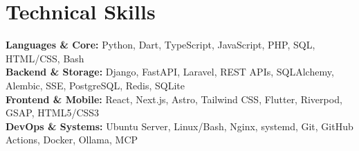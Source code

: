 \section{Technical Skills}

\noindent
\textbf{Languages \& Core:} Python, Dart, TypeScript, JavaScript, PHP, SQL, HTML/CSS, Bash \\
\textbf{Backend \& Storage:} Django, FastAPI, Laravel, REST APIs, SQLAlchemy, Alembic, SSE, PostgreSQL, Redis, SQLite \\
\textbf{Frontend \& Mobile:} React, Next.js, Astro, Tailwind CSS, Flutter, Riverpod, GSAP, HTML5/CSS3 \\
\textbf{DevOps \& Systems:} Ubuntu Server, Linux/Bash, Nginx, systemd, Git, GitHub Actions, Docker, Ollama, MCP

